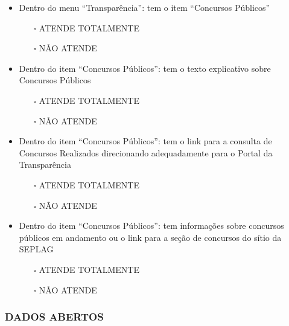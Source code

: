 \documentclass[
]{book}
\providecommand{\tightlist}{%
  \setlength{\itemsep}{0pt}\setlength{\parskip}{0pt}}
\begin{document}
\begin{itemize}
\tightlist
\item
  Dentro do menu ``Transparência'': tem o item ``Concursos Públicos''

  \begin{itemize}
  \tightlist
  \item[$\square$]
    ATENDE TOTALMENTE
  \item[$\square$]
    NÃO ATENDE
  \end{itemize}
\item
  Dentro do item ``Concursos Públicos'': tem o texto explicativo sobre Concursos Públicos

  \begin{itemize}
  \tightlist
  \item[$\square$]
    ATENDE TOTALMENTE
  \item[$\square$]
    NÃO ATENDE
  \end{itemize}
\item
  Dentro do item ``Concursos Públicos'': tem o link para a consulta de Concursos Realizados direcionando adequadamente para o Portal da Transparência

  \begin{itemize}
  \tightlist
  \item[$\square$]
    ATENDE TOTALMENTE
  \item[$\square$]
    NÃO ATENDE
  \end{itemize}
\item
  Dentro do item ``Concursos Públicos'': tem informações sobre concursos públicos em andamento ou o link para a seção de concursos do sítio da SEPLAG

  \begin{itemize}
  \tightlist
  \item[$\square$]
    ATENDE TOTALMENTE
  \item[$\square$]
    NÃO ATENDE
  \end{itemize}
\end{itemize}

\hypertarget{dados-abertos-1}{%
\subsubsection*{DADOS ABERTOS}\label{dados-abertos-1}}
\end{document}
